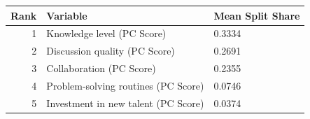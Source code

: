 
\begin{tabular}{rll}
\toprule
Rank & Variable & Mean Split Share\\
\midrule
1 & Knowledge level (PC Score) & 0.3334\\
2 & Discussion quality (PC Score) & 0.2691\\
3 & Collaboration (PC Score) & 0.2355\\
4 & Problem-solving routines (PC Score) & 0.0746\\
5 & Investment in new talent (PC Score) & 0.0374\\
\bottomrule
\end{tabular}
